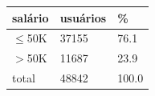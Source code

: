 \begin{tabular}{lll}
\toprule
salário & usuários & \% \\
\midrule
$\leq$50K & 37155 & 76.1 \\
$>$50K & 11687 & 23.9 \\
total & 48842 & 100.0 \\
\bottomrule
\end{tabular}
